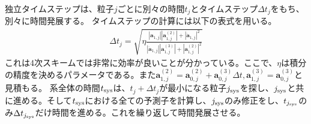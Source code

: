 \documentclass[a4paper,10pt,oneside,twocolumn,notitlepage,final]{jarticle}
\begin{document}
独立タイムステップは、粒子$j$ごとに別々の時間$t_j$とタイムステップ$\Delta t_j$をもち、別々に時間発展する。
タイムステップの計算には以下の表式を用いる\citep{Aarseth_1985}。
\begin{align}
\Delta t_j = \sqrt{\eta \frac{| {\bm a}_{1,j}| | {\bm a}_{1,j}^{(2)} | + | \dot{{\bm a}}_{1,j}| ^2}{| \dot{{\bm a}}_{1,j}| | {\bm a}_{1,j}^{(3)} | + | {\bm a}_{1,j}^{(2)} | ^2}}
\end{align}
これは4次スキームでは非常に効率が良いことが分かっている\citep{Makino_1991}。ここで、$\eta$は積分の精度を決めるパラメータである。また${\bm a}_{1,j}^{(2)} = {\bm a}_{0,j}^{(2)} + {\bm a}_{0,j}^{(3)} \Delta t, {\bm a}_{1,j}^{(3)} = {\bm a}_{0,j}^{(3)}$と見積もる。
系全体の時間$t_{\rm sys}$は、$t_j + \Delta t_j$が最小になる粒子$j_{\rm sys}$を探し、$j_{\rm sys}$と共に進める。そして$t_{\rm sys}$における全ての予測子を計算し、$j_{\rm sys}$のみ修正をし、$t_{j_{\rm sys}}$のみ$\Delta t_{j_{\rm sys}}$だけ時間を進める。これを繰り返して時間発展させる。
\end{document}
